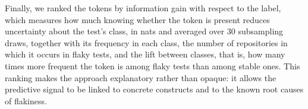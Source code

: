  Finally, we ranked the tokens by information gain with respect to the label, which measures how much knowing whether the token is present reduces uncertainty about the test's class, in nats and averaged over 30 subsampling draws, together with its frequency in each class, the number of repositories in which it occurs in flaky tests, and the lift between classes, that is, how many times more frequent the token is among flaky tests than among stable ones. This ranking makes the approach explanatory rather than opaque: it allows the predictive signal to be linked to concrete constructs and to the known root causes of flakiness. 